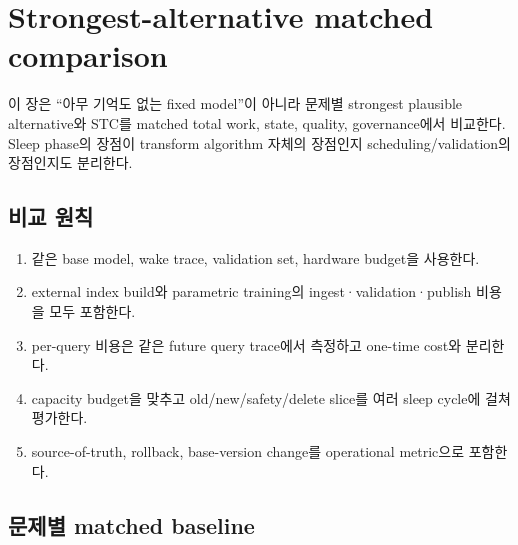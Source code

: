 \chapter{Strongest-alternative matched comparison}
\label{STC-S08}

이 장은 ``아무 기억도 없는 fixed model''이 아니라 문제별 strongest plausible alternative와 STC를
matched total work, state, quality, governance에서 비교한다. Sleep phase의 장점이 transform algorithm
자체의 장점인지 scheduling/validation의 장점인지도 분리한다.

\section{비교 원칙}

\begin{enumerate}
  \item 같은 base model, wake trace, validation set, hardware budget을 사용한다.
  \item external index build와 parametric training의 ingest·validation·publish 비용을 모두 포함한다.
  \item per-query 비용은 같은 future query trace에서 측정하고 one-time cost와 분리한다.
  \item capacity budget을 맞추고 old/new/safety/delete slice를 여러 sleep cycle에 걸쳐 평가한다.
  \item source-of-truth, rollback, base-version change를 operational metric으로 포함한다.
\end{enumerate}

\section{문제별 matched baseline}


